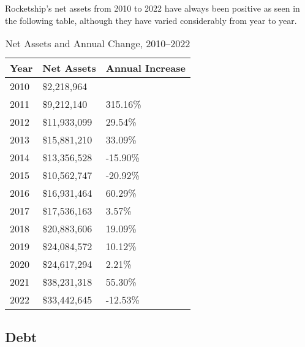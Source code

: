 Rocketship's net assets from 2010 to 2022 have always been positive as seen in the following table, although they have varied considerably from year to year.
\begin{table}[ht]\caption{Net Assets and Annual Change, 2010–2022}\label{tab:net_assets_annual_change}
  \begin{tabular}{lll}
    \toprule
    \textbf{Year} & \textbf{Net Assets} & \textbf{Annual Increase}\\
    \midrule
    2010 &   \$2,218,964	&            \\
    2011 &   \$9,212,140	&   315.16\% \\
    2012 &  \$11,933,099	&    29.54\% \\
    2013 &  \$15,881,210	&    33.09\% \\ 
    2014 &  \$13,356,528	&   -15.90\% \\
    2015 &  \$10,562,747	&   -20.92\% \\
    2016 &  \$16,931,464	&    60.29\% \\
    2017 &  \$17,536,163	&     3.57\% \\
    2018 &  \$20,883,606	&    19.09\% \\
    2019 &  \$24,084,572        &    10.12\% \\
    2020 &  \$24,617,294        &     2.21\% \\
    2021 &  \$38,231,318	&    55.30\% \\ 
    2022 &  \$33,442,645        &   -12.53\% \\
    \bottomrule
  \end{tabular}
\end{table}



\subsection{Debt}\indent%
\label{sec:debt}


